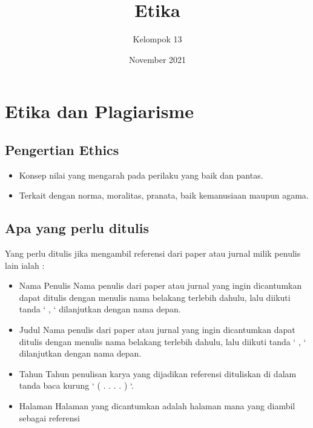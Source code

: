 \documentclass{article}
\title{Etika}
\author{Kelompok 13}
\date{November 2021}
\begin{document}
\maketitle

\section{Etika dan Plagiarisme}

\subsection{Pengertian Ethics}
\begin{itemize}
    \item Konsep nilai yang mengarah pada perilaku yang baik dan pantas.
    \item Terkait dengan norma, moralitas, pranata, baik kemanusiaan maupun agama.
\end{itemize}

\subsection{Apa yang perlu ditulis}
Yang perlu ditulis jika mengambil referensi dari paper atau jurnal milik penulis lain ialah :
\begin{itemize}
  \item Nama Penulis
   \newline Nama penulis dari paper atau jurnal yang ingin dicantumkan dapat ditulis dengan menulis nama belakang terlebih dahulu, lalu diikuti tanda ‘ , ‘ dilanjutkan dengan nama depan.
  \item Judul
  \newline Nama penulis dari paper atau jurnal yang ingin dicantumkan dapat ditulis dengan menulis nama belakang terlebih dahulu, lalu diikuti tanda ‘ , ‘ dilanjutkan dengan nama depan.
  \item Tahun
  \newline Tahun penulisan karya yang dijadikan referensi dituliskan di dalam tanda baca kurung ‘ ( . . . . ) ‘.
  \item Halaman
  \newline Halaman yang dicantumkan adalah halaman mana yang diambil sebagai referensi
\end{itemize}
\end{document}
